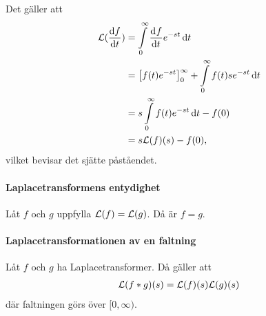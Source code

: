 Det gäller att
\begin{align*}
	\mathcal{L}(\dv{f}{t}) &= \int\limits_{0}^{\infty}\dv[]{f}{t} (t)e^{-st}\dd{t} \\
	                &= \left[f(t)e^{-st}\right]_{0}^{\infty} + \int\limits_{0}^{\infty}f(t)se^{-st}\dd{t} \\
	                &= s\int\limits_{0}^{\infty}f(t)e^{-st}\dd{t} - f(0) \\
	                &= s\mathcal{L}(f)(s) - f(0),
\end{align*}
vilket bevisar det sjätte påståendet.

\paragraph{Laplacetransformens entydighet}
Låt $f$ och $g$ uppfylla $\mathcal{L}(f) = \mathcal{L}(g)$. Då är $f = g$.

\proof

\paragraph{Laplacetransformationen av en faltning}
Låt $f$ och $g$ ha Laplacetransformer. Då gäller att
\begin{align*}
	\mathcal{L}(f * g)(s) = \mathcal{L}(f)(s)\mathcal{L}(g)(s)
\end{align*}
där faltningen görs över $[0, \infty)$.